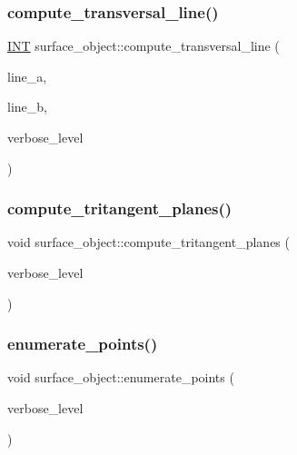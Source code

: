 \subsubsection{\texorpdfstring{compute\+\_\+transversal\+\_\+line()}{compute\_transversal\_line()}}
{\footnotesize\ttfamily \mbox{\hyperlink{galois_8h_a09fddde158a3a20bd2dcadb609de11dc}{I\+NT}} surface\+\_\+object\+::compute\+\_\+transversal\+\_\+line (\begin{DoxyParamCaption}\item[{\mbox{\hyperlink{galois_8h_a09fddde158a3a20bd2dcadb609de11dc}{I\+NT}}}]{line\+\_\+a,  }\item[{\mbox{\hyperlink{galois_8h_a09fddde158a3a20bd2dcadb609de11dc}{I\+NT}}}]{line\+\_\+b,  }\item[{\mbox{\hyperlink{galois_8h_a09fddde158a3a20bd2dcadb609de11dc}{I\+NT}}}]{verbose\+\_\+level }\end{DoxyParamCaption})}

\mbox{\label{classsurface__object_ae6d924af993146400e0e484e41def0ab}} 
\subsubsection{\texorpdfstring{compute\+\_\+tritangent\+\_\+planes()}{compute\_tritangent\_planes()}}
{\footnotesize\ttfamily void surface\+\_\+object\+::compute\+\_\+tritangent\+\_\+planes (\begin{DoxyParamCaption}\item[{\mbox{\hyperlink{galois_8h_a09fddde158a3a20bd2dcadb609de11dc}{I\+NT}}}]{verbose\+\_\+level }\end{DoxyParamCaption})}

\mbox{\label{classsurface__object_a001a13b6ea34dbe559033af634203466}} 
\subsubsection{\texorpdfstring{enumerate\+\_\+points()}{enumerate\_points()}}
{\footnotesize\ttfamily void surface\+\_\+object\+::enumerate\+\_\+points (\begin{DoxyParamCaption}\item[{\mbox{\hyperlink{galois_8h_a09fddde158a3a20bd2dcadb609de11dc}{I\+NT}}}]{verbose\+\_\+level }\end{DoxyParamCaption})}

